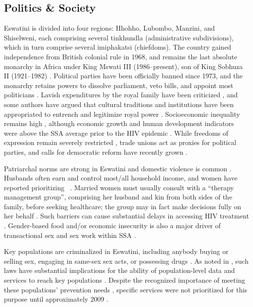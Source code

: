 \subsection{Politics \& Society}\label{intro.esw.soc}
Eswatini is divided into four regions: Hhohho, Lubombo, Manzini, and Shiselweni,
each comprising several tinkhundla (administrative subdivisions),
which in turn comprise several imiphakatsi (chiefdoms).
The country gained independence from British colonial rule in 1968,
and remains the last absolute monarchy in Africa
under King Mswati III (1986--present), son of King Sobhuza II (1921--1982) \cite{Mthembu2022}.
Political parties have been officially banned since 1973,
and the monarchy retains powers to
dissolve parliament, veto bills, and appoint most politicians \cite{Maphalala2021}.
Lavish expenditures by the royal family have been criticized \cite{Debly2014,Mthembu2022},
and some authors have argued that cultural traditions and institutions
have been appropriated to entrench and legitimize royal power \cite{Debly2014,Golomski2019}.
Socioeconomic inequality remains high \cite{Debly2014,Kali2023,DataBank},
although economic growth and human development indicators
were above the SSA average prior to the HIV epidemic \cite{Whiteside2007}.
While freedoms of expression remain severely restricted \cite{Debly2014,Mthembu2022},
trade unions act as proxies for political parties,
and calls for democratic reform have recently grown
\cite{Debly2014,Maphalala2021,Mthembu2022,Maseko2023}.
\par
Patriarchal norms are strong in Eswatini and domestic violence is common
\cite{Whiteside2003,Buseh2010,Simelane2011,Dlamini-Simelane2017,Golomski2019}.
Husbands often earn and control most/all household income, and women have reported prioritizing
~\cite{Dlamini-Simelane2017}.
Married women must usually consult with a ``therapy management group'',
comprising her husband and kin from both sides of the family, before seeking healthcare;
the group may in fact make decisions fully on her behalf \cite{Dlamini-Simelane2017}.
Such barriers can cause substantial delays in accessing HIV treatment \cite{Dlamini-Simelane2017}.
Gender-based food and/or economic insecurity is also a major driver of
transactional sex and sex work within SSA \cite{Scorgie2012}.
\par
Key populations are criminalized in Eswatini, including anybody
buying or selling sex, engaging in same-sex sex acts, or possessing drugs \cite{UNAIDS2022lpa}.
As noted in , such laws have substantial implications for
the ability of population-level data and services to reach key populations \cite{WHO2016kp}.
Despite the recognized importance of meeting these populations' prevention needs \cite{EswBSS2002},
specific services were not prioritized for this purpose until approximately 2009 \cite{NERCHA2009}.
